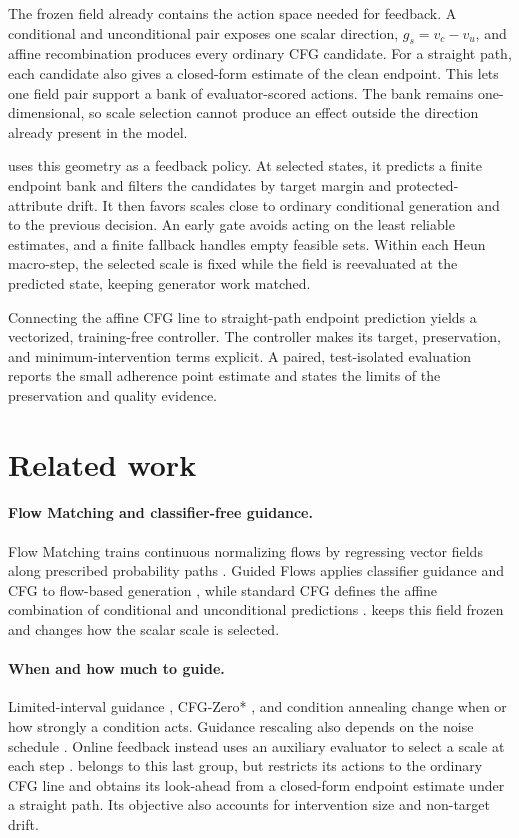 \documentclass[10pt,twocolumn,letterpaper]{article}
\begin{document}
The frozen field already contains the action space needed for feedback. A
conditional and unconditional pair exposes one scalar direction,
$g_s=v_c-v_u$, and affine recombination produces every ordinary CFG candidate.
For a straight path, each candidate also gives a closed-form estimate of the
clean endpoint. This lets one field pair support a bank of evaluator-scored actions.
The bank remains one-dimensional, so scale selection cannot produce an effect
outside the direction already present in the model.

\method uses this geometry as a feedback policy. At selected states, it
predicts a finite endpoint bank and filters the candidates by target margin and
protected-attribute drift. It then favors scales close to ordinary conditional
generation and to the previous decision. An early gate avoids acting on the
least reliable estimates, and a finite fallback handles empty feasible sets.
Within each Heun macro-step, the selected scale is fixed while the field is
reevaluated at the predicted state, keeping generator work matched.

Connecting the affine CFG line to straight-path endpoint prediction yields a
vectorized, training-free controller. The
controller makes its target, preservation, and minimum-intervention terms
explicit. A paired, test-isolated evaluation reports the small adherence point
estimate and states the limits of the preservation and quality evidence.

\section{Related work}

\paragraph{Flow Matching and classifier-free guidance.}
Flow Matching trains continuous normalizing flows by regressing vector fields
along prescribed probability paths \cite{lipman2023flow}. Guided Flows applies
classifier guidance and CFG to flow-based generation \cite{zheng2023guided},
while standard CFG defines the affine combination of conditional and
unconditional predictions \cite{ho2022classifierfree}. \method keeps this
field frozen and changes how the scalar scale is selected.

\paragraph{When and how much to guide.}
Limited-interval guidance \cite{kynkaanniemi2024applying}, CFG-Zero*
\cite{fan2025cfgzerostar}, and condition annealing \cite{sadat2024cads} change
when or how strongly a condition acts. Guidance rescaling also depends on the
noise schedule \cite{lin2023common}. Online feedback instead uses an auxiliary
evaluator to select a scale at each step \cite{papalampidi2025dynamic}.
\method belongs to this last group, but restricts its actions to the ordinary
CFG line and obtains its look-ahead from a closed-form endpoint estimate under
a straight path. Its objective also accounts for intervention size and
non-target drift.
\end{document}
